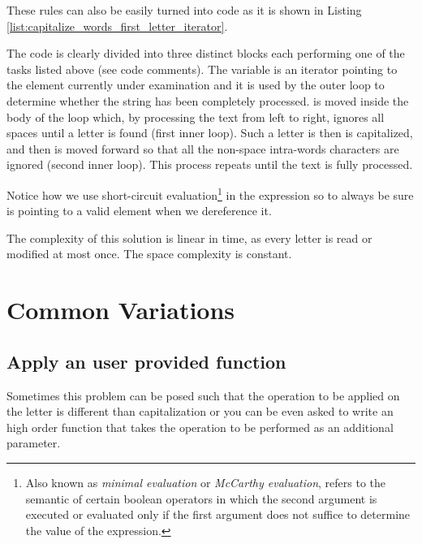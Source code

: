 These rules can also be easily turned into code as it is shown in Listing \ref{list:capitalize_words_first_letter_iterator}.



The code is clearly divided into three distinct blocks each performing one of the tasks listed above (see code comments).
The variable  is an iterator pointing to the  element currently under examination and it is used by the outer loop to determine whether the string has been completely processed.
 is moved inside the body of the loop which, by processing the text from left to right, ignores all spaces until a letter is found (first inner loop). Such a letter is then is capitalized, and then  is moved forward so that all the non-space intra-words characters are ignored (second inner loop). This process repeats until the text is fully processed. 

Notice how we use short-circuit evaluation\footnote{
	Also known as \textit{minimal evaluation} or \textit{McCarthy evaluation}, refers to the semantic of certain boolean operators in which the second argument is executed or evaluated only if the first argument does not suffice to determine the value of the expression.}\cite{cit:wiki:shortcircuit}
in the  expression so to always be sure  is pointing to a valid element when we dereference it.

The complexity of this solution is linear in time, as every letter is read or modified at most once. The space complexity is constant.



\section{Common Variations}
\label{capitalize_words_first_letter:sec:variation}

\subsection{Apply an user provided function}
Sometimes this problem can be posed such that the operation to be applied on the letter is different than capitalization or you can be even asked to write an high order function that takes the operation to be performed as an additional parameter.

